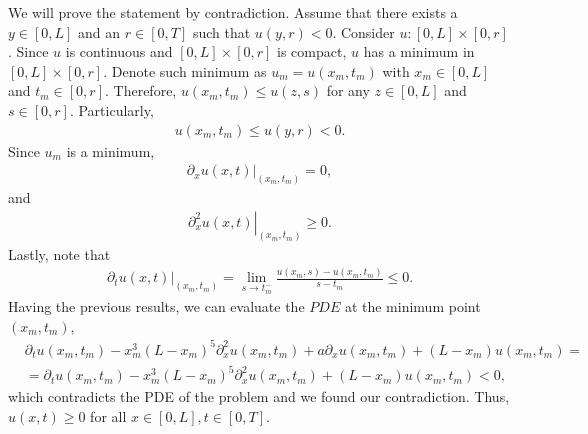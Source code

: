 \begin{questions}
\begin{solution}
We will prove the statement by contradiction. Assume that there exists a $y\in[0,L]$ and an $r\in[0,T]$ such that $u(y,r)<0$. Consider $u:[0,L]\times[0,r]$. Since $u$ is continuous and $[0,L]\times[0,r]$ is compact, $u$ has a minimum in $[0,L]\times[0,r]$. Denote such minimum as $u_m=u(x_m,t_m)$ with $x_m\in[0,L]$ and $t_m\in[0,r]$. Therefore, $u(x_m,t_m)\leq u(z,s)$ for any $z\in[0,L]$ and $s\in[0,r]$. Particularly,
\begin{align*}
u(x_m,t_m)\leq u(y,r)<0.
\end{align*}
Since $u_m$ is a minimum, 
\begin{align*}
\left.\partial_xu(x,t)\right|_{(x_m,t_m)}=0,
\end{align*}
and
\begin{align*}
\left.\partial^2_xu(x,t)\right|_{(x_m,t_m)}\geq 0.
\end{align*}
Lastly, note that
\begin{align*}
\left.\partial_tu(x,t)\right|_{(x_m,t_m)}=\lim_{s\rightarrow t_m^-}\frac{u(x_m,s)-u(x_m,t_m)}{s-t_m}\leq 0.
\end{align*}
Having the previous results, we can evaluate the $PDE$ at the minimum point $(x_m,t_m)$,
\begin{align*}
&\partial_tu(x_m,t_m)-x_m^3(L-x_m)^5\partial_x^2u(x_m,t_m)+a\partial_xu(x_m,t_m)+(L-x_m)u(x_m,t_m)=\\
&=\partial_tu(x_m,t_m)-x_m^3(L-x_m)^5\partial_x^2u(x_m,t_m)+(L-x_m)u(x_m,t_m)<0,
\end{align*}
which contradicts the PDE of the problem and we found our contradiction. Thus, $u(x,t)\geq 0$ for all $x\in[0,L],t\in[0,T]$.
\end{solution}
\end{questions}